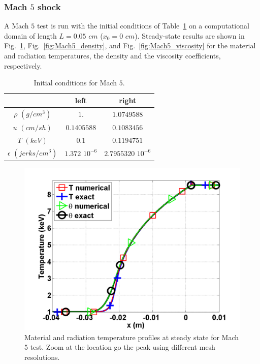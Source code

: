 \documentclass[review]{elsarticle}
\newcommand{\fig}[1]{Fig.~\ref{#1}}                      %
\newcommand{\tbl}[1]{Table~\ref{#1}}                     %
\begin{document}
\subsubsection{Mach $5$ shock}

A Mach $5$ test is run with the initial conditions of \tbl{tbl:table6} on a computational domain of length $L=0.05$ $cm$ ($x_0 = 0$ $cm$). Steady-state results are shown in \fig{fig:Mach5_temp}, \fig{fig:Mach5_density}, and \fig{fig:Mach5_viscosity} for the material and radiation temperatures, the density and the viscosity coefficients, respectively.
\begin{table}[H]
\caption{\label{tbl:table6} Initial conditions for Mach $5$.}
\begin{center}
\begin{tabular}{|c|c|c|}
\hline 
 & left  & right \\ \hline
$\rho$ $(g/cm^3)$ &$1.$ & $1.0749588$ \\ \hline
$u$ $(cm/sh)$& $0.1405588$ & $0.1083456$ \\ \hline
$T$ $(keV)$& $0.1$ & $0.1194751$\\ \hline
$\epsilon$ $(jerks/cm^3)$ & $1.372$ $10^{-6}$ & $2.7955320$ $10^{-6}$\\
\hline
\end{tabular}  
\end{center}  
\end{table}
\begin{figure}[H]
                \centering
                \includegraphics[width=\textwidth]{Mach_5_nel_1000_temperature.png}
        \caption{Material and radiation temperature profiles at steady state for Mach 5 test. Zoom at the location go the peak using different mesh resolutions.}\label{fig:Mach5_temp}
\end{figure}
\end{document}

